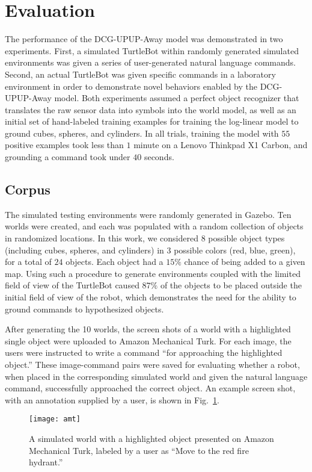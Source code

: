 \section{Evaluation}
\label{sec:evaluation}
The performance of the DCG-UPUP-Away model was demonstrated in two experiments.
First, a simulated TurtleBot within randomly generated simulated environments was given a series of user-generated natural language commands.
Second, an actual TurtleBot was given specific commands in a laboratory environment in order to demonstrate novel behaviors enabled by the DCG-UPUP-Away model.
Both experiments assumed a perfect object recognizer that translates the raw sensor data into symbols into the world model, as well as an initial set of hand-labeled training examples for training the log-linear model to ground cubes, spheres, and cylinders.
In all trials, training the model with $55$ positive examples took less than $1$ minute on a Lenovo Thinkpad X1 Carbon, and grounding a command took under $40$ seconds.

\subsection{Corpus}
The simulated testing environments were randomly generated in Gazebo.
Ten worlds were created, and each was populated with a random collection of objects in randomized locations.
In this work, we considered $8$ possible object types (including cubes, spheres, and cylinders) in $3$ possible colors (red, blue, green), for a total of $24$ objects.
Each object had a $15\%$ chance of being added to a given map.
Using such a procedure to generate environments coupled with the limited field of view of the TurtleBot caused $87\%$ of the objects to be placed outside the initial field of view of the robot, which demonstrates the need for the ability to ground commands to hypothesized objects.

After generating the 10 worlds, the screen shots of a world with a highlighted single object were uploaded to Amazon Mechanical Turk. For each image, the users were instructed to write a command ``for approaching the highlighted object.''
These image-command pairs were saved for evaluating whether a robot, when placed in the corresponding simulated world and given the natural language command, successfully approached the correct object.
An example screen shot, with an annotation supplied by a user, is shown in Fig.~\ref{fig:amt}.
\begin{figure}[htb!]
	\centering
    \texttt{[image: amt]}
	\caption{A simulated world with a highlighted object presented on Amazon Mechanical Turk, labeled by a user as ``Move to the red fire hydrant.''}
	\label{fig:amt}
\end{figure}
